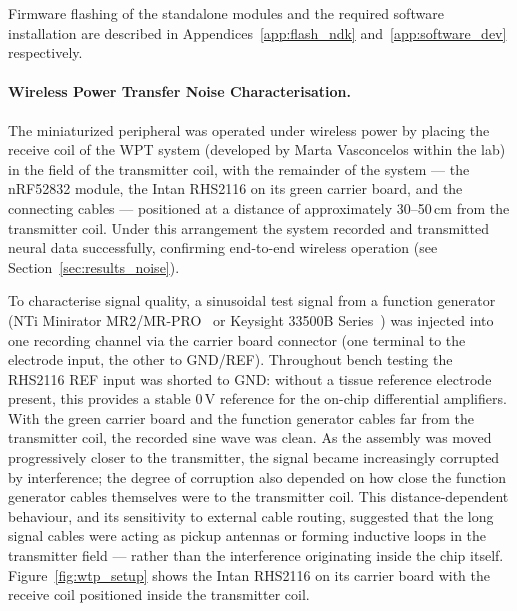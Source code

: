 Firmware flashing of the standalone modules and the required software installation are
described in Appendices~\ref{app:flash_ndk} and~\ref{app:software_dev} respectively.

\paragraph{Wireless Power Transfer Noise Characterisation.}
The miniaturized peripheral was operated under wireless power by placing the receive
coil of the WPT system (developed by Marta Vasconcelos within the lab)
in the field of the transmitter coil, with the remainder of the system --- the
nRF52832 module, the Intan RHS2116 on its green carrier board, and the connecting
cables --- positioned at a distance of approximately 30--50\,cm from the transmitter
coil. Under this arrangement the system recorded and transmitted neural data
successfully, confirming end-to-end wireless operation
(see Section~\ref{sec:results_noise}).

To characterise signal quality, a sinusoidal test signal from a function
generator (NTi Minirator MR2/MR-PRO~\cite{nti_minirator_mr2} or Keysight
33500B Series~\cite{keysight_33500b}) was injected into one recording channel via the
carrier board connector (one terminal to the electrode input, the other to
GND/REF). Throughout bench testing the RHS2116 REF input was shorted to GND:
without a tissue reference electrode present, this provides a stable 0\,V
reference for the on-chip differential amplifiers.
With the green carrier board and the function generator cables far from
the transmitter coil, the recorded sine wave was clean. As the assembly was moved
progressively closer to the transmitter, the signal became increasingly corrupted
by interference; the degree of corruption also depended on how close the function
generator cables themselves were to the transmitter coil. This distance-dependent
behaviour, and its sensitivity to external cable routing, suggested that the
long signal cables were acting as pickup antennas or forming inductive loops in
the transmitter field --- rather than the interference originating inside the chip
itself.
Figure~\ref{fig:wtp_setup} shows the Intan RHS2116 on its carrier board with the
receive coil positioned inside the transmitter coil.

